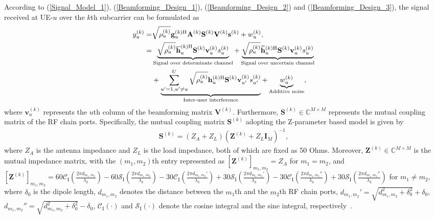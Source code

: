 \documentclass[lettersize,journal]{IEEEtran}
\theoremstyle{remark}
\begin{document}
According to (\ref{Signal_Model_1}), (\ref{Beamforming_Design_1}), (\ref{Beamforming_Design_2}) and (\ref{Beamforming_Design_3}), the signal received at UE-$u$ over the $k$th subcarrier can be formulated as
\begin{align}\label{Beamforming_Design_4}
    \notag y_u^{(k)}=&\sqrt{\rho_u^{(k)}}\mathbf{g}_u^{(k)\mathrm{H}}\mathbf{A}^{(k)}
    \mathbf{S}^{(k)}\mathbf{V}^{(k)}\mathbf{s}^{(k)}+w_u^{(k)},\\
    \notag=&\underbrace{\sqrt{\rho_u^{(k)}}\overline{\mathbf{h}}_u^{(k)\mathrm{H}}
    \mathbf{S}^{(k)}\mathbf{v}_u^{(k)}s_u^{(k)}}_{\text{Signal over determinate channel}}
    +\underbrace{\sqrt{\rho_u^{(k)}}\widetilde{\mathbf{h}}_u^{(k)\mathrm{H}}
    \mathbf{S}^{(k)}\mathbf{v}_u^{(k)}s_u^{(k)}}_{\text{Signal over uncertain channel}}\\
    &+\underbrace{\sum_{u'=1,u'\neq u}^{U}\sqrt{\rho_u^{(k)}}\mathbf{h}_u^{(k)\mathrm{H}}
    \mathbf{S}^{(k)}\mathbf{v}_{u'}^{(k)}s_{u'}^{(k)}}_{\text{Inter-user interference}}
    +\underbrace{w_u^{(k)}}_{\text{Additive noise}},
\end{align}
where $\mathbf{v}_u^{(k)}$ represents the $u$th column of the beamforming matrix $\mathbf{V}^{(k)}$. Furthermore, $\mathbf{S}^{(k)}\in\mathbb{C}^{M\times M}$ represents the mutual coupling matrix of the RF chain ports. Specifically, the mutual coupling matrix $\mathbf{S}^{(k)}$ adopting the Z-parameter based model is given by~\cite{chen2018review}
\begin{align}\label{Mutual_couple_1}
    \mathbf{S}^{(k)}=\left(Z_A+Z_L\right)\left(\mathbf{Z}^{(k)}+Z_L\mathbf{I}_M\right)^{-1},
\end{align}
where $Z_A$ is the antenna impedance and $Z_L$ is the load impedance, both of which are fixed as 50 Ohms. Moreover, $\mathbf{Z}^{(k)}\in\mathbb{C}^{M\times M}$ is the mutual impedance matrix, with the $(m_1,m_2)$th entry represented as $[\mathbf{Z}^{(k)}]_{m_1,m_2}=Z_A$ for $m_1=m_2$, and $[\mathbf{Z}^{(k)}]_{m_1,m_2}=60\mathcal{C}_\mathrm{I}(\frac{2\pi d_{m_1,m_2}}{\lambda_k})
-60\mathcal{S}_\mathrm{I}(\frac{2\pi d_{m_1,m_2}}{\lambda_k})-30\mathcal{C}_\mathrm{I}
(\frac{2\pi d_{m_1,m_2}'}{\lambda_k})+30\mathcal{S}_\mathrm{I}
(\frac{2\pi d_{m_1,m_2}'}{\lambda_k})-30\mathcal{C}_\mathrm{I}
(\frac{2\pi d_{m_1,m_2}''}{\lambda_k})+30\mathcal{S}_\mathrm{I}
(\frac{2\pi d_{m_1,m_2}''}{\lambda_k})$ for $m_1\neq m_2$, where $\delta_0$ is the dipole length, $d_{m_1,m_2}$ denotes the distance between the $m_1$th and the $m_2$th RF chain ports, $d_{m_1,m_2}'=\sqrt{d_{m_1,m_2}^2+\delta_0^2}+\delta_0$, $d_{m_1,m_2}''=\sqrt{d_{m_1,m_2}^2+\delta_0^2}-\delta_0$, $\mathcal{C}_\mathrm{I}(\cdot)$ and $\mathcal{S}_\mathrm{I}(\cdot)$ denote the cosine integral and the sine integral, respectively~\cite{balanis2015antenna}.
\end{document}
